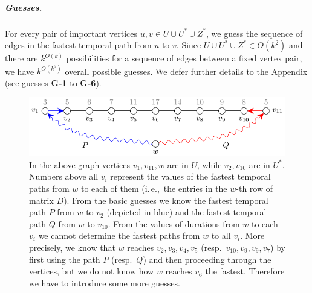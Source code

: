 \documentclass[a4paper,UKenglish,cleveref, autoref, thm-restate, anonymous]{lipics-v2021}
\newcommand{\ie}{i.\,e.,\ }
\newcounter{guesscounter}
\begin{document}
\subparagraph{Guesses.} 
For every pair of important vertices $u,v \in U \cup U^{\ast} \cup Z^{\ast}$, we guess the sequence of edges in the fastest temporal path from $u$ to $v$. Since $U \cup U^{\ast} \cup Z^{\ast}\in O(k^2)$ and there are $k^{O(k)}$ possibilities for a sequence of edges between a fixed vertex pair, we have $k^{O(k^5)}$ overall possible guesses. We  defer further details to the Appendix (see guesses \textcolor{lipicsGray}{\textsf{\textbf{G-1}}} to \textcolor{lipicsGray}{\textsf{\textbf{G-6}}}).

\setcounter{guesscounter}{6}

\begin{figure}[t]
	\centering
	\includegraphics[width=0.75\columnwidth]{fig-exampleg10}
	\caption{In the above graph vertices $v_1, v_{11}, w$ are in $U$, while $v_2, v_{10}$ are in $U^*$. 
		Numbers above all $v_i$ represent the values of the fastest temporal paths from $w$ to each of them (\ie the entries in the $w$-th row of matrix $D$).
		From the basic guesses we know the fastest temporal path $P$ from $w$ to $v_2$ (depicted in blue) and the fastest temporal path $Q$ from $w$ to $v_{10}$.
		From the values of durations from $w$ to each $v_i$ we cannot 
		determine the fastest paths from $w$ to all $v_i$.
		More precisely, we know that $w$ reaches $v_2, v_3, v_4, v_5$ (resp.~$v_{10}, v_{9}, v_{9}, v_{7}$) 
		by first using the path $P$ (resp.~$Q$) and then proceeding through the vertices,
		but we do not know how $w$ reaches $v_6$ the fastest.
		Therefore we have to introduce some more guesses.
  \label{fig:guesses-advanced}}
\end{figure}
\end{document}
